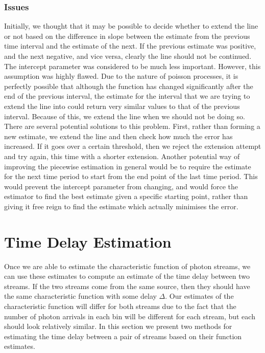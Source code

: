 \documentclass[a4paper,11pt]{article}
\begin{document}
\subsubsection{Issues}
\label{sec-6-3-1}

    Initially, we thought that it may be possible to decide whether to
    extend the line or not based on the difference in slope between
    the estimate from the previous time interval and the estimate of
    the next. If the previous estimate was positive, and the next
    negative, and vice versa, clearly the line should not be
    continued. The intercept parameter was considered to be much less
    important. However, this assumption was highly flawed. Due to the
    nature of poisson processes, it is perfectly possible that
    although the function has changed significantly after the end of
    the previous interval, the estimate for the interval that we are
    trying to extend the line into could return very similar values to
    that of the previous interval. Because of this, we extend the line
    when we should not be doing so. There are several potential
    solutions to this problem. First, rather than forming a new
    estimate, we extend the line and then check how much the error has
    increased. If it goes over a certain threshold, then we reject the
    extension attempt and try again, this time with a shorter
    extension. Another potential way of improving the piecewise
    estimation in general would be to require the estimate for the
    next time period to start from the end point of the last time
    period. This would prevent the intercept parameter from changing,
    and would force the estimator to find the best estimate given a
    specific starting point, rather than giving it free reign to find
    the estimate which actually minimises the error.
\section{Time Delay Estimation}
\label{sec-7}

  Once we are able to estimate the characteristic function of photon streams, we
  can use these estimates to compute an estimate of the time delay between two
  streams. If the two streams come from the same source, then they should have the
  same characteristic function with some delay $\Delta$. Our estimates of the
  characteristic function will differ for both streams due to the fact that the
  number of photon arrivals in each bin will be different for each stream, but
  each should look relatively similar. In this section we present two methods for
  estimating the time delay between a pair of streams based on their function estimates.
\end{document}
